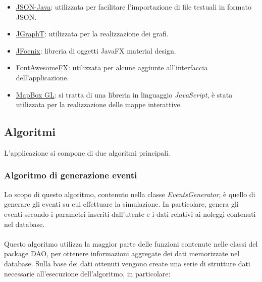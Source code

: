 \documentclass[a4paper, 12pt]{article}
\begin{document}
	\begin{itemize}
		\item \href{https://github.com/stleary/JSON-java}{JSON-Java}: utilizzata per facilitare l'importazione di file testuali in formato JSON.
		\item \href{https://jgrapht.org/}{JGraphT}: utilizzata per la realizzazione dei grafi.
		\item \href{http://www.jfoenix.com/}{JFoenix}: libreria di oggetti JavaFX material design.
		\item \href{https://github.com/Jerady/fontawesomefx-glyphsbrowser}{FontAwesomeFX}: utilizzata per alcune aggiunte all'interfaccia dell'applicazione.
		\item \href{https://docs.mapbox.com/mapbox-gl-js/api/}{MapBox GL}: si tratta di una libreria in linguaggio \textit{JavaScript}, è stata utilizzata per la realizzazione delle mappe interattive.
	\end{itemize}

	

\newpage

	\subsection{Algoritmi}

	L'applicazione si compone di due algoritmi principali.

	\subsubsection{Algoritmo di generazione eventi}

		Lo scopo di questo algoritmo, contenuto nella classe \textit{EventsGenerator}, è quello di generare gli eventi su cui effettuare la simulazione. In particolare, genera gli eventi secondo i parametri inseriti dall'utente e i dati relativi ai noleggi contenuti nel database.\\\\
		Questo algoritmo utilizza la maggior parte delle funzioni contenute nelle classi del package DAO, per ottenere informazioni aggregate dei dati memorizzate nel database. Sulla base dei dati ottenuti vengono create una serie di strutture dati necessarie all'esecuzione dell'algoritmo, in particolare:
\end{document}
